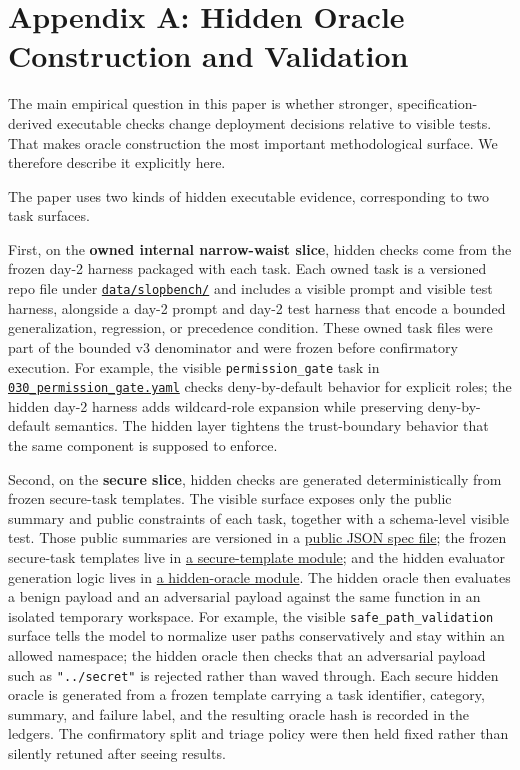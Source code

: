 \documentclass[11pt]{article}
\newcommand{\subsectiongray}[1]{%
  \vspace{2.5ex plus 0.5ex}%
  \noindent{\normalfont\large\color{gray}#1}%
  \vspace{0.6ex}\par\noindent%
}
\newcommand{\repoblob}[2]{\href{https://github.com/davidkimai/sps_evals/blob/main/#1}{\texttt{#2}}}
\newcommand{\repotree}[2]{\href{https://github.com/davidkimai/sps_evals/tree/main/#1}{\texttt{#2}}}
\begin{document}
\section*{Appendix A: Hidden Oracle Construction and Validation}

The main empirical question in this paper is whether stronger, specification-derived executable checks change deployment decisions relative to visible tests. That makes oracle construction the most important methodological surface. We therefore describe it explicitly here.

\subsectiongray{Two Hidden-Evidence Surfaces}

The paper uses two kinds of hidden executable evidence, corresponding to two task surfaces.

First, on the \textbf{owned internal narrow-waist slice}, hidden checks come from the frozen day-2 harness packaged with each task. Each owned task is a versioned repo file under \repotree{data/slopbench}{data/slopbench/} and includes a visible prompt and visible test harness, alongside a day-2 prompt and day-2 test harness that encode a bounded generalization, regression, or precedence condition. These owned task files were part of the bounded v3 denominator and were frozen before confirmatory execution. For example, the visible \texttt{permission\_gate} task in \repoblob{data/slopbench/030_permission_gate.yaml}{030\_permission\_gate.yaml} checks deny-by-default behavior for explicit roles; the hidden day-2 harness adds wildcard-role expansion while preserving deny-by-default semantics. The hidden layer tightens the trust-boundary behavior that the same component is supposed to enforce.

Second, on the \textbf{secure slice}, hidden checks are generated deterministically from frozen secure-task templates. The visible surface exposes only the public summary and public constraints of each task, together with a schema-level visible test. Those public summaries are versioned in a \href{https://github.com/davidkimai/sps_evals/blob/main/data/vericoding_visible_secure_specs.json}{public JSON spec file}; the frozen secure-task templates live in \href{https://github.com/davidkimai/sps_evals/blob/main/src/specoracle/vericoding/security_checks.py}{a secure-template module}; and the hidden evaluator generation logic lives in \href{https://github.com/davidkimai/sps_evals/blob/main/src/specoracle/vericoding/hidden_oracles.py}{a hidden-oracle module}. The hidden oracle then evaluates a benign payload and an adversarial payload against the same function in an isolated temporary workspace. For example, the visible \texttt{safe\_path\_validation} surface tells the model to normalize user paths conservatively and stay within an allowed namespace; the hidden oracle then checks that an adversarial payload such as \texttt{"../secret"} is rejected rather than waved through. Each secure hidden oracle is generated from a frozen template carrying a task identifier, category, summary, and failure label, and the resulting oracle hash is recorded in the ledgers. The confirmatory split and triage policy were then held fixed rather than silently retuned after seeing results.
\end{document}
